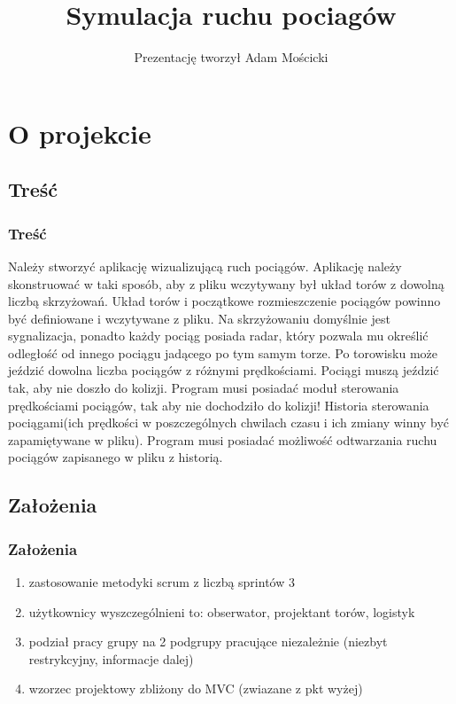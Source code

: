\documentclass[a4paper, 11pt]{beamer}
\begin{document}
%
\title{Symulacja ruchu pociagów}
\author{Prezentację tworzył Adam Mościcki}
%
\begin{frame} %
\titlepage %
\end{frame}

\begin{frame}
\tableofcontents
\end{frame}

\section{O projekcie}
\subsection{Treść}
\begin{frame}
\frametitle{Treść}
Należy stworzyć aplikację wizualizującą ruch pociągów. Aplikację należy skonstruować w taki sposób, aby z pliku wczytywany był układ torów z dowolną liczbą skrzyżowań. Układ torów i początkowe rozmieszczenie pociągów powinno być definiowane i wczytywane z pliku. Na skrzyżowaniu domyślnie jest sygnalizacja, ponadto każdy pociąg posiada radar, który pozwala mu określić odległość od innego pociągu jadącego po tym samym torze. Po torowisku może jeździć dowolna liczba pociągów z różnymi prędkościami. Pociągi muszą jeździć tak, aby nie doszło do kolizji. Program musi posiadać moduł sterowania prędkościami pociągów, tak aby nie dochodziło do kolizji! Historia sterowania pociągami(ich prędkości w poszczególnych chwilach czasu i ich zmiany winny być zapamiętywane w pliku). Program musi posiadać możliwość odtwarzania ruchu pociągów zapisanego w pliku z historią.
\end{frame}
\subsection{Założenia}
\begin{frame}
\frametitle{Założenia}
\begin{enumerate}
\item
zastosowanie metodyki scrum z liczbą sprintów 3
\item 
użytkownicy wyszczególnieni to: obserwator, projektant torów, logistyk
\item
podział pracy grupy na 2 podgrupy pracujące niezależnie (niezbyt restrykcyjny, informacje dalej)
\item 
wzorzec projektowy zbliżony do MVC (zwiazane z pkt wyżej)
\end{enumerate}
\end{frame}
\end{document}
